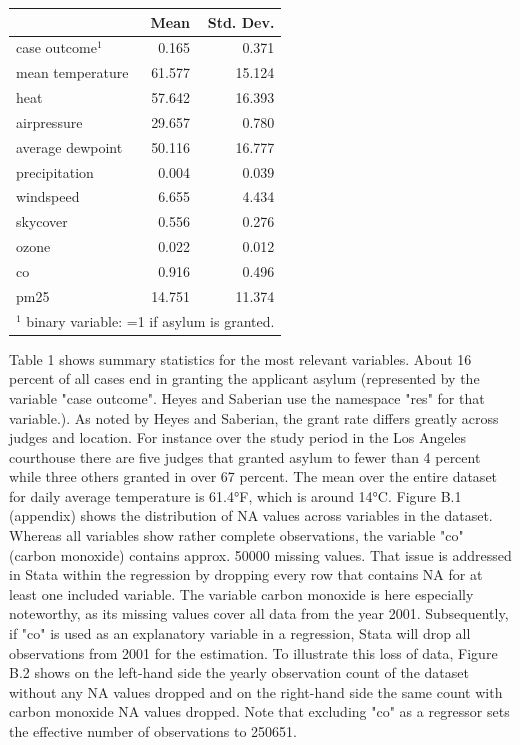 \documentclass[11pt]{article}
\begin{document}
	\begin{center}
		 \label{tab:title}
		\begin{tabular}{lrr}
			\hline\hline
			{} &       Mean &  Std. Dev. \\
			\hline
			case outcome$^1$          &   0.165 &      0.371 \\
			mean temperature     &  61.577 &     15.124 \\
			heat         &  57.642 &     16.393 \\
			airpressure &  29.657 &      0.780 \\
			average dewpoint     &  50.116 &     16.777 \\
			precipitation      &   0.004 &      0.039 \\
			windspeed   &   6.655 &      4.434 \\
			skycover     &   0.556 &      0.276 \\
			ozone        &   0.022 &      0.012 \\
			co           &   0.916 &      0.496 \\
			pm25         &  14.751 &     11.374 \\
			\hline\hline
			\multicolumn{3}{l}{\footnotesize $^1$ binary variable: =1 if asylum is granted. }\\
		\end{tabular}
	\end{center}

	Table 1 shows summary statistics for the most relevant variables. About 16 percent of all cases end in granting the applicant asylum (represented by the variable "case outcome". Heyes and Saberian use the namespace "res" for that variable.). As noted by Heyes and Saberian, the grant rate differs greatly across judges and location. For instance over the study period in the Los Angeles courthouse there are five judges that granted asylum to fewer than 4 percent while three others granted in over 67 percent. The mean over the entire dataset for daily average temperature is 61.4°F, which is around 14°C.
	\newline Figure B.1 (appendix) shows the distribution of NA values across variables in the dataset. Whereas all variables show rather complete observations, the variable "co" (carbon monoxide) contains approx. 50000 missing values. That issue is addressed in Stata within the regression by dropping every row that contains NA for at least one included variable. The variable carbon monoxide is here especially noteworthy, as its missing values cover all data from the year 2001. Subsequently, if "co" is used as an explanatory variable in a regression, Stata will drop all observations from 2001 for the estimation. To illustrate this loss of data, Figure B.2 shows on the left-hand side the yearly observation count of the dataset without any NA values dropped and on the right-hand side the same count with carbon monoxide NA values dropped. Note that excluding "co" as a regressor sets the effective number of observations to 250651.
\end{document}
